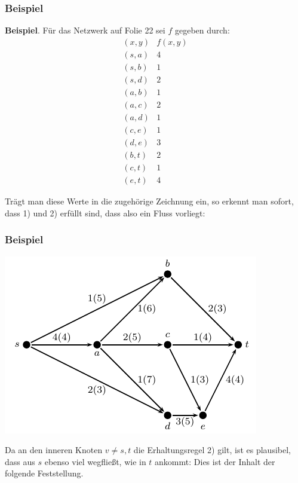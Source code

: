 \documentclass[smaller]{beamer}
\begin{document}
\begin{frame}
 \frametitle{Beispiel}
 \textbf{Beispiel}. Für das Netzwerk auf Folie 22 sei $f$ gegeben durch:
\[
\begin{array}{c|c}
(x,y) & f(x,y) \\ \hline\hline
(s,a) & 4 \\
(s,b) & 1 \\
(s,d) & 2 \\
(a,b) & 1 \\
(a,c) & 2 \\
(a,d) & 1 \\
(c,e) & 1 \\
(d,e) & 3 \\
(b,t) & 2 \\
(c,t) & 1 \\
(e,t) & 4
\end{array}
\]

Trägt man diese Werte in die zugehörige Zeichnung ein, so erkennt man sofort, \alert{dass 1) und 2) erfüllt sind, dass also ein Fluss vorliegt:}
\end{frame}

\begin{frame}
 \frametitle{Beispiel}
 \begin{center}
  \includegraphics{fig10.pdf}
 \end{center}

 Da an den inneren Knoten $v \neq s,t$ die Erhaltungsregel 2) gilt, ist es \alert{plausibel}, dass aus $s$ ebenso viel wegfließt, wie in $t$ ankommt: Dies ist der Inhalt der folgende Feststellung.
\end{frame}
\end{document}
